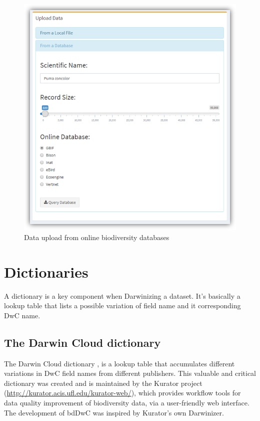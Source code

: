\documentclass[]{book}
\theoremstyle{definition}
\theoremstyle{definition}
\theoremstyle{definition}
\theoremstyle{remark}
\begin{document}
\begin{figure}
\centering
\includegraphics{img/bdDwC_Up-database.png}
\caption{Data upload from online biodiversity databases}
\end{figure}

\section{Dictionaries}\label{dictionaries}

A dictionary is a key component when Darwinizing a dataset. It's
basically a lookup table that lists a possible variation of field name
and it corresponding DwC name.

\hypertarget{the-darwin-cloud-dictionary}{\subsection{The Darwin Cloud
dictionary}\label{the-darwin-cloud-dictionary}}

The Darwin Cloud dictionary \citep{DarwinCloud}, is a lookup table that
accumulates different variations in DwC field names from different
publishers. This valuable and critical dictionary was created and is
maintained by the Kurator project
(\url{http://kurator.acis.ufl.edu/kurator-web/}), which provides
workflow tools for data quality improvement of biodiversity data, via a
user-friendly web interface. The development of bdDwC was inspired by
Kurator's own Darwinizer.
\end{document}
